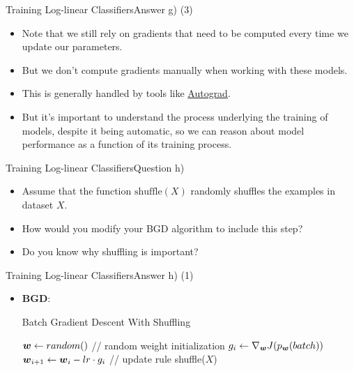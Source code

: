 \documentclass[t]{beamer}
\begin{document}
\begin{frame}{Training Log-linear Classifiers}{Answer g) (3)}
    \begin{itemize}
        \item Note that we still rely on gradients that need to be computed
              every time we update our parameters.
        \item But we don't compute gradients manually when working with these
              models.
        \item This is generally handled by tools
              like \href{https://pytorch.org/tutorials/beginner/blitz/autograd_tutorial.html}{Autograd}.
        \item But it's important to understand the process underlying the
              training of models, despite it being automatic, so we can reason
              about model performance as a function of its training process.
    \end{itemize}
\end{frame}

\begin{frame}{Training Log-linear Classifiers}{Question h)}
    \begin{itemize}
        \item Assume that the function $\text{shuffle}(X)$ randomly shuffles the
              examples in dataset $X$.
        \item How would you modify your BGD algorithm to include this step?
        \item Do you know why shuffling is important?
    \end{itemize}
\end{frame}

\begin{frame}{Training Log-linear Classifiers}{Answer h) (1)}
    \begin{itemize}
        \item \textbf{BGD}:
              {\tiny
              \begin{algorithm}[H]
                  \caption{Batch Gradient Descent With Shuffling}
                  \label{alg:bgd_shuffled}
                  \begin{algorithmic}[1]
                      \State ${\boldsymbol{w}}\leftarrow random()$ \qquad   // random weight initialization
                      \State $g_i\leftarrow \nabla_{{\boldsymbol{w}}}J(p_{{\boldsymbol{w}}}(batch))$
                      \State ${\boldsymbol{w}}_{i+1}\leftarrow {\boldsymbol{w}}_i - lr \cdot g_i$ \qquad   // update rule
                      \EndFor
                      \State shuffle($X$)
                      \EndFor
                      \EndProcedure
                  \end{algorithmic}
              \end{algorithm}
              }
    \end{itemize}
\end{frame}
\end{document}
